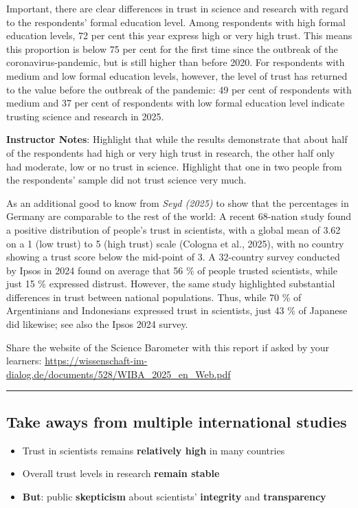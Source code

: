 \documentclass[
  english,
  letterpaper,
  DIV=11,
  numbers=noendperiod]{scrartcl}
\providecommand{\tightlist}{%
  \setlength{\itemsep}{0pt}\setlength{\parskip}{0pt}}
\begin{document}
Important, there are clear differences in trust in science and research
with regard to the respondents' formal education level. Among
respondents with high formal education levels, 72 per cent this year
express high or very high trust. This means this proportion is below 75
per cent for the first time since the outbreak of the
coronavirus-pandemic, but is still higher than before 2020. For
respondents with medium and low formal education levels, however, the
level of trust has returned to the value before the outbreak of the
pandemic: 49 per cent of respondents with medium and 37 per cent of
respondents with low formal education level indicate trusting science
and research in 2025.

\textbf{Instructor Notes}: Highlight that while the results demonstrate
that about half of the respondents had high or very high trust in
research, the other half only had moderate, low or no trust in science.
Highlight that one in two people from the respondents' sample did not
trust science very much.

As an additional good to know from \emph{Seyd (2025)} to show that the
percentages in Germany are comparable to the rest of the world: A recent
68-nation study found a positive distribution of people's trust in
scientists, with a global mean of 3.62 on a 1 (low trust) to 5 (high
trust) scale (Cologna et al., 2025), with no country showing a trust
score below the mid-point of 3. A 32-country survey conducted by Ipsos
in 2024 found on average that 56 \% of people trusted scientists, while
just 15 \% expressed distrust. However, the same study highlighted
substantial differences in trust between national populations. Thus,
while 70 \% of Argentinians and Indonesians expressed trust in
scientists, just 43 \% of Japanese did likewise; see also the Ipsos 2024
survey.

Share the website of the Science Barometer with this report if asked by
your learners:
\url{https://wissenschaft-im-dialog.de/documents/528/WIBA_2025_en_Web.pdf}

\begin{center}\rule{0.5\linewidth}{0.5pt}\end{center}

\subsection{Take aways from multiple international
studies}\label{take-aways-from-multiple-international-studies}

\begin{itemize}
\tightlist
\item
  Trust in scientists remains \textbf{relatively high} in many countries
\item
  Overall trust levels in research \textbf{remain stable}
\item
  \textbf{But}: public \textbf{skepticism} about scientists'
  \textbf{integrity} and \textbf{transparency}
\end{itemize}
\end{document}
